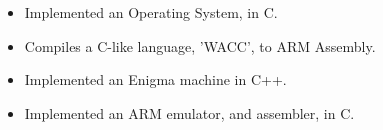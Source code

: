 \documentclass{jcgcv}
\begin{document}
\begin{column}
\begin{adjustwidth}{0.3cm}{}
\begin{itemize}
  \item Implemented an Operating System, in C.
\end{itemize}

\begin{itemize}
  \item Compiles a C-like language, 'WACC', to ARM Assembly.
\end{itemize}

\begin{itemize}
  \item Implemented an Enigma machine in C++.
\end{itemize}

\begin{itemize}
  \item Implemented an ARM emulator, and assembler, in C.
\end{itemize}

\end{adjustwidth}



\end{column}%
\end{document}
